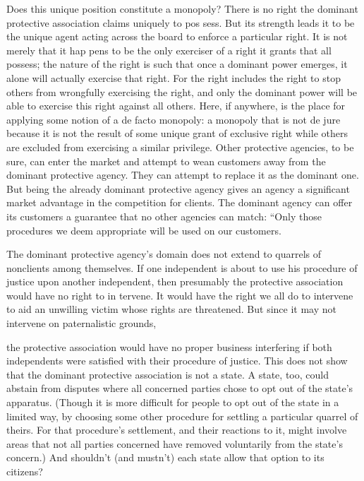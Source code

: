 \documentclass[11pt,openany]{book}
\begin{document}
Does this unique position constitute a monopoly? There is no right the dominant protective association claims uniquely to pos sess. But its strength leads it to be the unique agent acting across the board to enforce a particular right. It is not merely that it hap pens to be the only exerciser of a right it grants that all possess; the nature of the right is such that once a dominant power emerges, it alone will actually exercise that right. For the right includes the right to stop others from wrongfully exercising the right, and only the dominant power will be able to exercise this right against all others. Here, if anywhere, is the place for applying some notion of a de facto monopoly: a monopoly that is not de jure because it is not the result of some unique grant of exclusive right while others are excluded from exercising a similar privilege. Other protective agencies, to be sure, can enter the market and attempt to wean customers away from the dominant protective agency. They can attempt to replace it as the dominant one. But being the already dominant protective agency gives an agency a significant market advantage in the competition for clients. The dominant agency can offer its customers a guarantee that no other agencies can match: ``Only those procedures we deem appropriate will be used on our customers. 

The dominant protective agency's domain does not extend to quarrels of nonclients among themselves. If one independent is about to use his procedure of justice upon another independent, then presumably the protective association would have no right to in tervene. It would have the right we all do to intervene to aid an unwilling victim whose rights are threatened. But since it may not intervene on paternalistic grounds, 

the protective association would have no proper business interfering if both independents were satisfied with their procedure of justice. This does not show that the dominant protective association is not a state. A state, too, could abstain from disputes where all concerned parties chose to opt out of the state's apparatus. (Though it is more difficult for people to opt out of the state in a limited way, by choosing some other procedure for settling a particular quarrel of theirs. For that procedure's settlement, and their reactions to it, might involve areas that not all parties concerned have removed voluntarily from the state's concern.) And shouldn't (and mustn't) each state allow that option to its citizens? 
\end{document}
